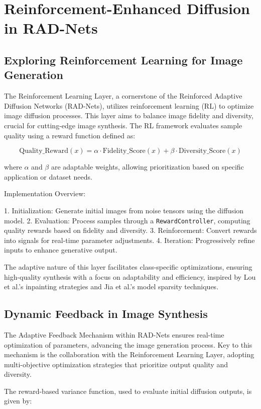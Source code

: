 \section{Reinforcement-Enhanced Diffusion in RAD-Nets}

\subsection{Exploring Reinforcement Learning for Image Generation}
The Reinforcement Learning Layer, a cornerstone of the Reinforced Adaptive Diffusion Networks (RAD-Nets), utilizes reinforcement learning (RL) to optimize image diffusion processes. This layer aims to balance image fidelity and diversity, crucial for cutting-edge image synthesis. The RL framework evaluates sample quality using a reward function defined as:

\[
\text{Quality\_Reward}(x) = \alpha \cdot \text{Fidelity\_Score}(x) + \beta \cdot \text{Diversity\_Score}(x)
\]

where \(\alpha\) and \(\beta\) are adaptable weights, allowing prioritization based on specific application or dataset needs.

Implementation Overview:

1. Initialization: Generate initial images from noise tensors using the diffusion model.
2. Evaluation: Process samples through a \texttt{RewardController}, computing quality rewards based on fidelity and diversity.
3. Reinforcement: Convert rewards into signals for real-time parameter adjustments.
4. Iteration: Progressively refine inputs to enhance generative output.

The adaptive nature of this layer facilitates class-specific optimizations, ensuring high-quality synthesis with a focus on adaptability and efficiency, inspired by Lou et al.'s inpainting strategies and Jia et al.'s model sparsity techniques.

\subsection{Dynamic Feedback in Image Synthesis}
The Adaptive Feedback Mechanism within RAD-Nets ensures real-time optimization of parameters, advancing the image generation process. Key to this mechanism is the collaboration with the Reinforcement Learning Layer, adopting multi-objective optimization strategies that prioritize output quality and diversity.

The reward-based variance function, used to evaluate initial diffusion outputs, is given by:

